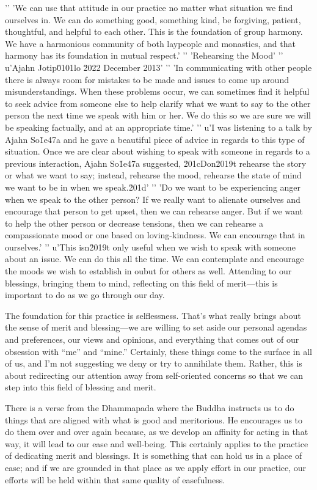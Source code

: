 '\n'
'We can use that attitude in our practice no matter what situation we find ourselves in. We can do something good, something kind, be forgiving, patient, thoughtful, and helpful to each other. This is the foundation of group harmony. We have a harmonious community of both laypeople and monastics, and that harmony has its foundation in mutual respect.'
'\n'
'Rehearsing the Mood'
'\n'
u'Ajahn Jotip\u0101lo \u2022 December 2013'
'\n'
'In communicating with other people there is always room for mistakes to be made and issues to come up around misunderstandings. When these problems occur, we can sometimes find it helpful to seek advice from someone else to help clarify what we want to say to the other person the next time we speak with him or her. We do this so we are sure we will be speaking factually, and at an appropriate time.'
'\n'
u'I was listening to a talk by Ajahn So\u1e47a and he gave a beautiful piece of advice in regards to this type of situation. Once we are clear about wishing to speak with someone in regards to a previous interaction, Ajahn So\u1e47a suggested, \u201cDon\u2019t rehearse the story or what we want to say; instead, rehearse the mood, rehearse the state of mind we want to be in when we speak.\u201d'
'\n'
'Do we want to be experiencing anger when we speak to the other person? If we really want to alienate ourselves and encourage that person to get upset, then we can rehearse anger. But if we want to help the other person or decrease tensions, then we can rehearse a compassionate mood or one based on loving-kindness. We can encourage that in ourselves.'
'\n'
u'This isn\u2019t only useful when we wish to speak with someone about an issue. We can do this all the time. We can contemplate and encourage the moods we wish to establish in oubut for others as well. Attending to our blessings, bringing them to 
mind, reflecting on this field of merit---this is important to do as we 
go through our day.

The foundation for this practice is selflessness. That's what really 
brings about the sense of merit and blessing---we are willing to set 
aside our personal agendas and preferences, our views and opinions, and 
everything that comes out of our obsession with ``me'' and ``mine.'' 
Certainly, these things come to the surface in all of us, and I'm not 
suggesting we deny or try to annihilate them. Rather, this is about 
redirecting our attention away from self-oriented concerns so that we 
can step into this field of blessing and merit.

There is a verse from the Dhammapada where the Buddha instructs us to 
do things that are aligned with what is good and meritorious. He 
encourages us to do them over and over again because, as we develop an 
affinity for acting in that way, it will lead to our ease and 
well-being. This certainly applies to the practice of dedicating merit 
and blessings. It is something that can hold us in a place of ease; and 
if we are grounded in that place as we apply effort in our practice, 
our efforts will be held within that same quality of easefulness.

